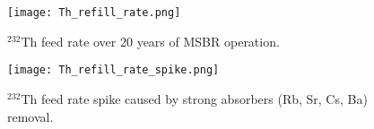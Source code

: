 \begin{figure}[htp!] %
  \centering
    \vspace{-0.3em}
  \texttt{[image: Th\_refill\_rate.png]} 
      \vspace{-1.5em}
  \caption{$^{232}$Th feed rate over 20 years of \gls{MSBR} operation.}
    \vspace{-0.6em}
  \label{fig:th_refill}
\end{figure}
\begin{figure}[htp!] %
  \centering
    \vspace{-0.3em}
  \texttt{[image: Th\_refill\_rate\_spike.png]} 
      \vspace{-1.5em}
  \caption{$^{232}$Th feed rate spike caused by strong absorbers (Rb, Sr, Cs, Ba) removal.}
    \vspace{-0.6em}
  \label{fig:th_refill_spike}
\end{figure}
\FloatBarrier
